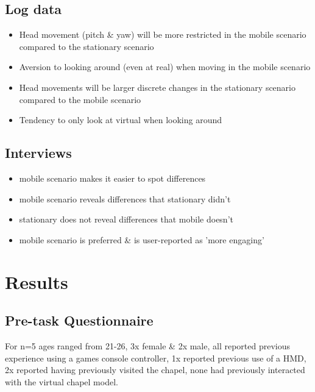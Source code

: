 \documentclass[oneside]{book}
\begin{document}
\subsection{Log data}
\begin{itemize}
	\item Head movement (pitch \& yaw) will be more restricted in the mobile scenario compared to the stationary scenario
	\item Aversion to looking around (even at real) when moving in the mobile scenario
	\item Head movements will be larger discrete changes in the stationary scenario compared to the mobile scenario
	\item Tendency to only look at virtual when looking around
\end{itemize}

\subsection{Interviews}
\begin{itemize}
	\item mobile scenario makes it easier to spot differences
	\item mobile scenario reveals differences that stationary didn't
	\item stationary does not reveal differences that mobile doesn't
	\item mobile scenario is preferred \& is user-reported as 'more engaging'
\end{itemize}


\section{Results}

\subsection{Pre-task Questionnaire}

For n=5 ages ranged from 21-26, 3x female \& 2x male, all reported previous experience using a games console controller, 1x reported previous use of a HMD, 2x reported having previously visited the chapel, none had previously interacted with the virtual chapel model.

\end{document}
